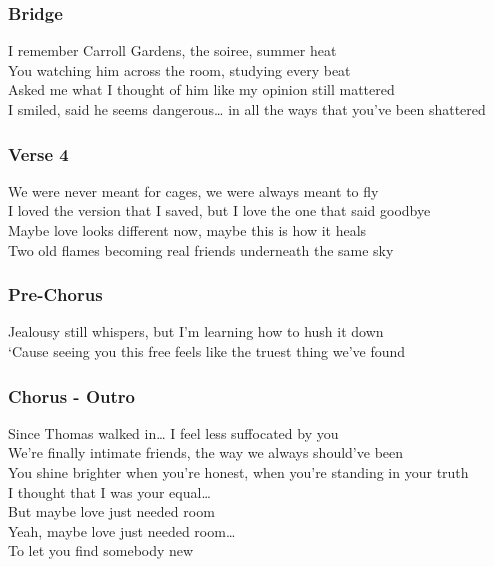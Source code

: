 \subsubsection{Bridge}\label{bridge-21}

I remember Carroll Gardens, the soiree, summer heat\\
You watching him across the room, studying every beat\\
Asked me what I thought of him like my opinion still mattered\\
I smiled, said he seems dangerous\ldots{} in all the ways that you've
been shattered

\subsubsection{Verse 4}\label{verse-4-12}

We were never meant for cages, we were always meant to fly\\
I loved the version that I saved, but I love the one that said goodbye\\
Maybe love looks different now, maybe this is how it heals\\
Two old flames becoming real friends underneath the same sky

\subsubsection{Pre-Chorus}\label{pre-chorus-50}

Jealousy still whispers, but I'm learning how to hush it down\\
`Cause seeing you this free feels like the truest thing we've found

\subsubsection{Chorus - Outro}\label{chorus---outro}

Since Thomas walked in\ldots{} I feel less suffocated by you\\
We're finally intimate friends, the way we always should've been\\
You shine brighter when you're honest, when you're standing in your
truth\\
I thought that I was your equal\ldots{}\\
But maybe love just needed room\\
Yeah, maybe love just needed room\ldots{}\\
To let you find somebody new

